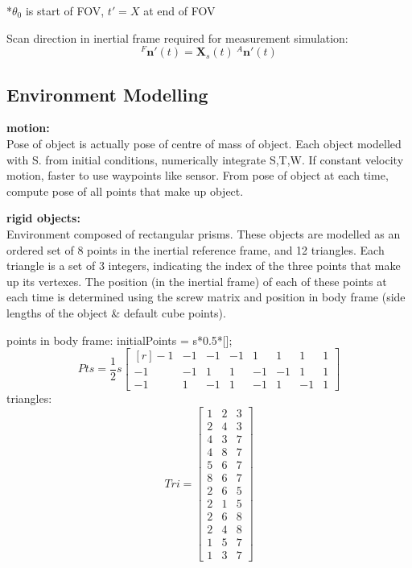 *$\theta_0$ is start of FOV, $t'=X$ at end of FOV

Scan direction in inertial frame required for measurement simulation:
\begin{equation}
	{^{F}\mathbf{n'}(t)} = \mathbf{X}_s(t)\:{^{A}\mathbf{n'}(t)}
\end{equation}

\subsection{Environment Modelling}

\textbf{motion:}\\
Pose of object is actually pose of centre of mass of object.
Each object modelled with S. from initial conditions, numerically integrate S,T,W. If constant velocity motion, faster to use waypoints like sensor.
From pose of object at each time, compute pose of all points that make up object.

\textbf{rigid objects:}\\
Environment composed of rectangular prisms. These objects are modelled as an ordered set of 8 points in the inertial reference frame, and 12 triangles. Each triangle is a set of 3 integers, indicating the index of the three points that make up its vertexes.
The position (in the inertial frame) of each of these points at each time is determined using the screw matrix and position in body frame (side lengths of the object \& default cube points).

points in body frame:
initialPoints = s*0.5*[];
\begin{equation}
	Pts = \frac{1}{2}s
	\begin{bmatrix*}[r]
		-1  &  -1  &  -1  &  -1  &   1  &   1  &   1  &  1 \\
		-1  &  -1  &   1  &   1  &  -1  &  -1  &   1  &  1 \\
		-1  &   1  &  -1  &   1  &  -1  &   1  &  -1  &  1 
	\end{bmatrix*}
\end{equation}
triangles:
\begin{equation}
	Tri = 
	\begin{bmatrix}
	1 & 2 & 3 \\
	2 & 4 & 3 \\
    4 & 3 & 7 \\
    4 & 8 & 7 \\
    5 & 6 & 7 \\
    8 & 6 & 7 \\
    2 & 6 & 5 \\
    2 & 1 & 5 \\
    2 & 6 & 8 \\
    2 & 4 & 8 \\
    1 & 5 & 7 \\
    1 & 3 & 7
	\end{bmatrix}
\end{equation}

